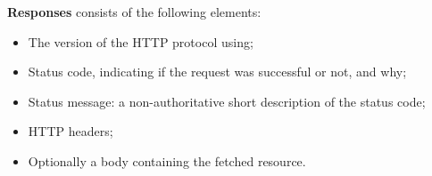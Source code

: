\clearpage
\textbf{Responses} consists of the following elements:
\begin{itemize}
	\item The version of the HTTP protocol using;
	\item Status code, indicating if the request was successful or not, and why;
	\item Status message: a non-authoritative short description of the status code;
	\item HTTP headers;
	\item Optionally a body containing the fetched resource.
\end{itemize}
